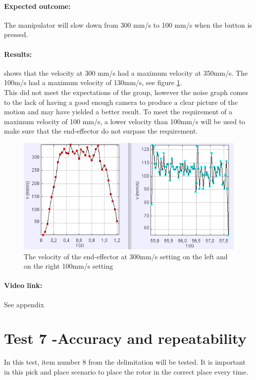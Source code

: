 \paragraph{Expected outcome:}
The manipulator will slow down from 300 mm/s to 100 mm/s when the button is pressed.

\paragraph{Results: }
shows that the velocity at 300 mm/s had a maximum velocity at 350mm/s. The 100m/s had a maximum velocity of 130mm/s, see figure \ref{fig:velocitytest}.\\
This did not meet the expectations of the group, however the noise graph comes to the lack of having a good enough camera to produce a clear picture of the motion and may have yielded a better result. To meet the requirement of a maximum velocity of 100 mm/s, a lower velocity than 100mm/s will be used to make sure that the end-effector do not surpass the requirement.\\ 

\begin{figure}[H]
  \centering
    \includegraphics[width=\textwidth]{Design/velcit.PNG}
    \caption{The velocity of the end-effector at 300mm/s setting on the left and on the right 100mm/s setting}  \label{fig:velocitytest}
\end{figure}

\paragraph{Video link: }
See appendix \cite{testfilm}

\section{Test 7 -Accuracy and repeatability}
In this test, item number 8 from the delimitation will be tested. It is important in this pick and place scenario to place the rotor in the correct place every time. 

